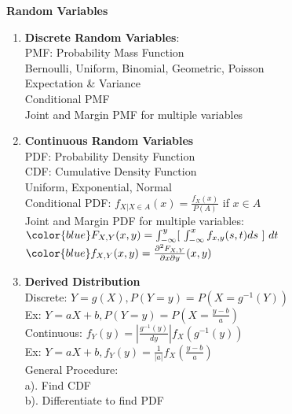 \documentclass[10pt,landscape]{article}
\begin{document}
\begin{multicols}{3}
\begin{enumerate}
\end{enumerate}		
			
\begin{center}
     \Large {\textbf{Random Variables}} \\
\end{center}

\begin{enumerate}
		
	\item \textbf{Discrete Random Variables}: \\
			PMF: Probability Mass Function\\
			Bernoulli, Uniform, Binomial, Geometric, Poisson\\
			Expectation \& Variance\\
			Conditional PMF\\
			Joint and Margin PMF for multiple variables\\
			
			
	\item \textbf{Continuous Random Variables}\\
			PDF: Probability Density Function\\
			CDF: Cumulative Density Function\\
			Uniform, Exponential, Normal\\
			Conditional PDF: $f_{X|X\in A}(x) = \frac{f_X(x)}{P(A)}$ if $x \in A$\\
			Joint and Margin PDF for multiple variables:\\
			$\color{blue} F_{X,Y}(x,y) =  \int_{-\infty}^y [\ \int_{-\infty}^x f_{x,y}(s,t)ds\ ]\  dt$\\
			$\color{blue} f_{X,Y}(x,y) = \frac{\partial^2 F_{X,Y}}{\partial x \partial y}(x,y)$\\
			
	\item \textbf{Derived Distribution}\\
			Discrete: $Y = g(X), P(Y = y) = P(X = g^{-1}(Y))$\\
			Ex: $Y = aX+b, P(Y = y) = P(X = \frac{y-b}{a})$\\
			Continuous: $f_Y(y) = |\frac{g^{-1}(y)}{dy}| f_X(g^{-1}(y))$\\
			Ex: $Y = aX+b, f_Y(y) = \frac{1}{|a|}f_X(\frac{y-b}{a})$\\
			
			General Procedure:\\
			a). Find CDF\\
			b). Differentiate to find PDF\\
			

\end{enumerate}
\end{multicols}
\end{document}
